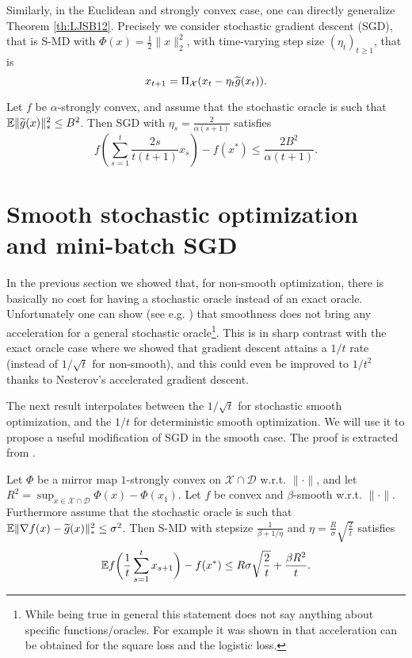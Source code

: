 Similarly, in the Euclidean and strongly convex case, one can directly generalize Theorem \ref{th:LJSB12}. Precisely we consider stochastic gradient descent (SGD), that is S-MD with $\Phi(x) = \frac12 \|x\|_2^2$, with time-varying step size $(\eta_t)_{t \geq 1}$, that is
$$x_{t+1} = \Pi_{\mathcal{X}}(x_t - \eta_t \widetilde{g}(x_t)) .$$
\begin{theorem} \label{th:sgdstrong}
Let $f$ be $\alpha$-strongly convex, and assume that the stochastic oracle is such that $\mathbb{E} \|\widetilde{g}(x)\|_*^2 \leq B^2$. Then SGD with $\eta_s = \frac{2}{\alpha (s+1)}$ satisfies
$$f \left(\sum_{s=1}^t \frac{2 s}{t(t+1)} x_s \right) - f(x^*) \leq \frac{2 B^2}{\alpha (t+1)} .$$
\end{theorem}

\section{Smooth stochastic optimization and mini-batch SGD}
In the previous section we showed that, for non-smooth optimization, there is basically no cost for having a stochastic oracle instead of an exact oracle. Unfortunately one can show (see e.g. \cite{Tsy03}) that smoothness does not bring any acceleration for a general stochastic oracle\footnote{While being true in general this statement does not say anything about specific functions/oracles. For example it was shown in \cite{BM13} that acceleration can be obtained for the square loss and the logistic loss.}. This is in sharp contrast with the exact oracle case where we showed that gradient descent attains a $1/t$ rate (instead of $1/\sqrt{t}$ for non-smooth), and this could even be improved to $1/t^2$ thanks to Nesterov's accelerated gradient descent. 

The next result interpolates between the $1/\sqrt{t}$ for stochastic smooth optimization, and the $1/t$ for deterministic smooth optimization. We will use it to propose a useful modification of SGD in the smooth case. The proof is extracted from \cite{DGBSX12}.

\begin{theorem} \label{th:SMDsmooth}
Let $\Phi$ be a mirror map $1$-strongly convex on $\mathcal{X} \cap \mathcal{D}$ w.r.t. $\|\cdot\|$, and let $R^2 = \sup_{x \in \mathcal{X} \cap \mathcal{D}} \Phi(x) - \Phi(x_1)$. Let $f$ be convex and $\beta$-smooth w.r.t. $\|\cdot\|$. Furthermore assume that the stochastic oracle is such that $\mathbb{E} \|\nabla f(x) - \widetilde{g}(x)\|_*^2 \leq \sigma^2$. Then S-MD with stepsize $\frac{1}{\beta + 1/\eta}$ and $\eta = \frac{R}{\sigma} \sqrt{\frac{2}{t}}$ satisfies
$$\mathbb{E} f\bigg(\frac{1}{t} \sum_{s=1}^t x_{s+1} \bigg) - f(x^*) \leq R \sigma \sqrt{\frac{2}{t}} + \frac{\beta R^2}{t} .$$
\end{theorem}

